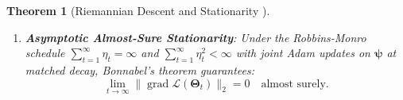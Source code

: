 \documentclass[journal]{IEEEtran}
\newtheorem{theorem}{Theorem}
\begin{document}
\begin{theorem}[Riemannian Descent and Stationarity \cite{bonnabel2013stochastic,absil2008optimization}]
\begin{enumerate}
\begin{equation}
    \label{eq:finite_horizon_bound}
    \end{equation}
    achieving the non-convex stochastic rate $\mathcal{O}(1/\sqrt{T})$ with $\eta_t = \mathcal{O}(1/\sqrt{T})$.
    \item \textbf{Asymptotic Almost-Sure Stationarity}: Under the Robbins-Monro schedule $\sum_{t=1}^\infty \eta_t = \infty$ and $\sum_{t=1}^\infty \eta_t^2 < \infty$ with joint Adam updates on $\boldsymbol{\psi}$ at matched decay, Bonnabel's theorem \cite{bonnabel2013stochastic} guarantees:
    \begin{equation}
    \lim_{t\to\infty} \|\operatorname{grad}\mathcal{L}(\boldsymbol{\Theta}_t)\|_2 = 0 \quad \text{almost surely}.
    \end{equation}
\end{enumerate}
\end{theorem}
\end{document}
